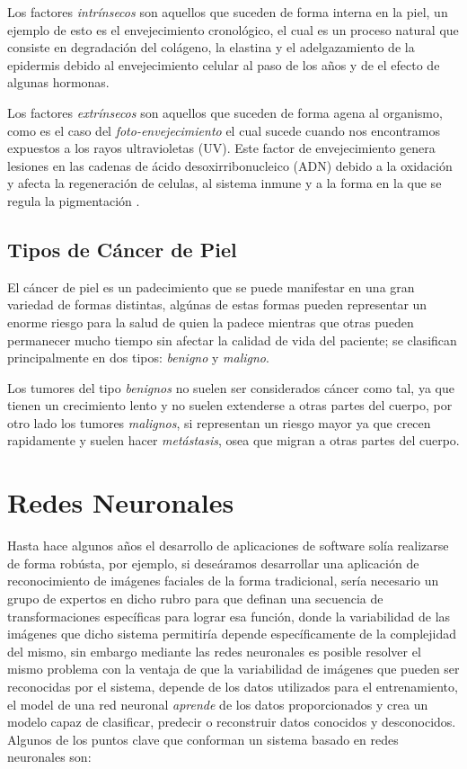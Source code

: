 Los factores \emph{intrínsecos} son aquellos que suceden de forma interna en la piel, un ejemplo de esto es el envejecimiento cronológico, el cual es un proceso natural que consiste en degradación del colágeno, la elastina y el adelgazamiento de la epidermis debido al envejecimiento celular al paso de los años y de el efecto de algunas hormonas.

Los factores \emph{extrínsecos} son aquellos que suceden de forma agena al organismo, como es el caso del \emph{foto-envejecimiento} el cual sucede cuando nos encontramos expuestos a los rayos ultravioletas (UV). Este factor de envejecimiento genera lesiones en las cadenas de ácido desoxirribonucleico (ADN) debido a la oxidación y afecta la regeneración de celulas, al sistema inmune y a la forma en la que se regula la pigmentación \citep{skin_aging}.

\subsection{Tipos de Cáncer de Piel}
El cáncer de piel es un padecimiento que se puede manifestar en una gran variedad de formas distintas, algúnas de estas formas pueden representar un enorme riesgo para la salud de quien la padece mientras que otras pueden permanecer mucho tiempo sin afectar la calidad de vida del paciente; se clasifican principalmente en dos tipos: \emph{benigno} y \emph{maligno}.

Los tumores del tipo \emph{benignos} no suelen ser considerados cáncer como tal, ya que tienen un crecimiento lento y no suelen extenderse a otras partes del cuerpo, por otro lado los tumores \emph{malignos}, si representan un riesgo mayor ya que crecen rapidamente y suelen hacer \emph{metástasis}, osea que migran a otras partes del cuerpo. 

\section{Redes Neuronales}

Hasta hace algunos años el desarrollo de aplicaciones de software solía realizarse de forma robústa, por ejemplo, si deseáramos desarrollar una aplicación de reconocimiento de imágenes faciales de la forma tradicional, sería necesario un grupo de expertos en dicho rubro para que definan una secuencia de transformaciones específicas para lograr esa función, donde la variabilidad de las imágenes que dicho sistema permitiría depende específicamente de la complejidad del mismo, sin embargo mediante las redes neuronales es posible resolver el mismo problema con la ventaja de que la variabilidad de imágenes que pueden ser reconocidas por el sistema, depende de los datos utilizados para el entrenamiento, el model de una red neuronal \emph{aprende} de los datos proporcionados y crea un modelo capaz de clasificar, predecir o reconstruir datos conocidos y desconocidos. Algunos de los puntos clave que conforman un sistema basado en redes neuronales son:

